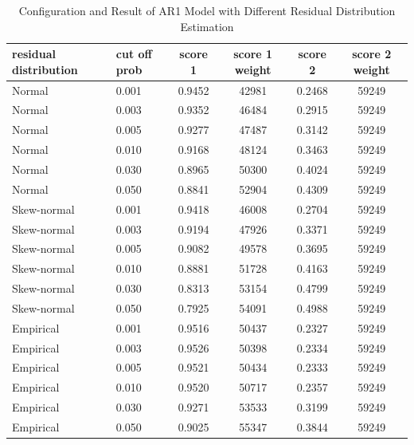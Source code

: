 \documentclass{article}
\begin{document}
\begin{table}[htbp]
  \begin{center}
    \caption{Configuration and Result of AR1 Model with Different Residual Distribution Estimation}
    \label{tab:tab1.3.2}
    \begin{tabular}{l|l|*{4}{c}} \textbf{residual distribution} & \textbf{cut
      off prob} & \textbf{score 1} & \textbf{score 1 weight} & \textbf{score 2}
      & \textbf{score 2 weight} \\
      \hline
      Normal & 0.001 & 0.9452 & 42981 & 0.2468 & 59249\\
      Normal & 0.003 & 0.9352 & 46484 & 0.2915 & 59249\\
      Normal & 0.005 & 0.9277 & 47487 & 0.3142 & 59249\\
      Normal & 0.010 & 0.9168 & 48124 & 0.3463 & 59249\\
      Normal & 0.030 & 0.8965 & 50300 & 0.4024 & 59249\\
      Normal & 0.050 & 0.8841 & 52904 & 0.4309 & 59249\\
      Skew-normal & 0.001 & 0.9418 & 46008 & 0.2704 & 59249\\
      Skew-normal & 0.003 & 0.9194 & 47926 & 0.3371 & 59249\\
      Skew-normal & 0.005 & 0.9082 & 49578 & 0.3695 & 59249\\
      Skew-normal & 0.010 & 0.8881 & 51728 & 0.4163 & 59249\\
      Skew-normal & 0.030 & 0.8313 & 53154 & 0.4799 & 59249\\
      Skew-normal & 0.050 & 0.7925 & 54091 & 0.4988 & 59249\\
      Empirical & 0.001 & 0.9516 & 50437 & 0.2327 & 59249\\
      Empirical & 0.003 & 0.9526 & 50398 & 0.2334 & 59249\\
      Empirical & 0.005 & 0.9521 & 50434 & 0.2333 & 59249\\
      Empirical & 0.010 & 0.9520 & 50717 & 0.2357 & 59249\\
      Empirical & 0.030 & 0.9271 & 53533 & 0.3199 & 59249\\
      Empirical & 0.050 & 0.9025 & 55347 & 0.3844 & 59249\\
    \end{tabular}
  \end{center}
\end{table}
\end{document}
